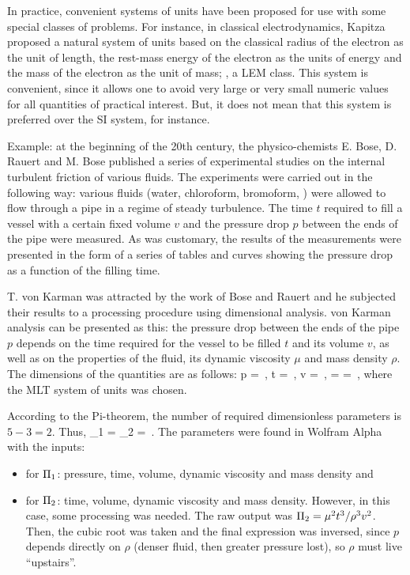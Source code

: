 In practice, convenient systems of units have been proposed for use with some special classes of problems. For instance, in classical electrodynamics, Kapitza proposed a natural system of units based on the classical radius of the electron as the unit of length, the rest-mass energy of the electron as the units of energy and the mass of the electron as the unit of mass; \ie, a LEM class. This system is convenient, since it allows one to avoid very large or very small numeric values for all quantities of practical interest. But, it does not mean that this system is preferred over the SI system, for instance.

Example: at the beginning of the 20th century, the physico-chemists E. Bose, D. Rauert and M. Bose published a series of experimental studies on the internal turbulent friction of various fluids. The experiments were carried out in the following way: various fluids (water, chloroform, bromoform, \etc) were allowed to flow through a pipe in a regime of steady turbulence. The time $t$ required to fill a vessel with a certain fixed volume $v$ and the pressure drop $p$ between the ends of the pipe were measured. As was customary, the results of the measurements were presented in the form of a series of tables and curves showing the pressure drop as a function of the filling time.

T. von Karman was attracted by the work of Bose and Rauert and he subjected their results to a processing procedure using dimensional analysis. von Karman analysis can be presented as this: the pressure drop between the ends of the pipe $p$ depends on the time required for the vessel to be filled $t$ and its volume $v$, as well as on the properties of the fluid, its dynamic viscosity $\mu$ and mass density $\rho$. The dimensions of the quantities are as follows:
\beq
\dim p = \,,\;
\dim t = \,,\;
\dim v = \,,\;
\dim\mu  = \;\;
\dim\rho = \,,
\eeq
where the MLT system of units was chosen.

According to the Pi-theorem, the number of required dimensionless parameters is $5 - 3 = 2$. Thus, 
\beq
\kdim_1 = \qquad{}\qquad 
\kdim_2 = \,.
\eeq
The parameters were found in Wolfram Alpha with the inputs:
\begin{itemize}
\item for $\Pi_1$: pressure, time, volume, dynamic viscosity and mass density and
%
\item for $\Pi_2$: time, volume, dynamic viscosity and mass density. However, in this case, some processing was needed. The raw output was $\Pi_2 = \mu^2 t^3/\rho^3 v^2$. Then, the cubic root was taken and the final expression was inversed, since $p$ depends directly on $\rho$ (denser fluid, then greater pressure lost), so $\rho$ must live ``upstairs''.
\end{itemize}

